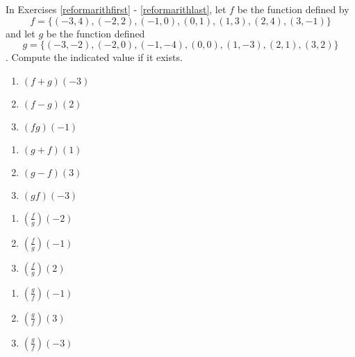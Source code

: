 In Exercises \ref{reformarithfirst} - \ref{reformarithlast}, let $f$ be the function defined by \[f = \{(-3, 4), (-2, 2), (-1, 0), (0, 1), (1, 3), (2, 4), (3, -1)\}\] and let $g$ be the function defined \[g = \{(-3, -2), (-2, 0), (-1, -4), (0, 0), (1, -3), (2, 1), (3, 2)\}\]. Compute the indicated value if it exists.

\begin{multicols}{3}
\begin{enumerate}
\setcounter{enumi}{\value{HW}}

\item $(f + g)(-3)$ \label{reformarithfirst}
\item $(f - g)(2)$
\item $(fg)(-1)$

\setcounter{HW}{\value{enumi}}
\end{enumerate}
\end{multicols}

\begin{multicols}{3}
\begin{enumerate}
\setcounter{enumi}{\value{HW}}

\item $(g + f)(1)$
\item $(g - f)(3)$
\item $(gf)(-3)$

\setcounter{HW}{\value{enumi}}
\end{enumerate}
\end{multicols}

\begin{multicols}{3}
\begin{enumerate}
\setcounter{enumi}{\value{HW}}

\item $\left(\frac{f}{g}\right)(-2)$
\item $\left(\frac{f}{g}\right)(-1)$
\item $\left(\frac{f}{g}\right)(2)$

\setcounter{HW}{\value{enumi}}
\end{enumerate}
\end{multicols}

\begin{multicols}{3}
\begin{enumerate}
\setcounter{enumi}{\value{HW}}

\item $\left(\frac{g}{f}\right)(-1)$
\item $\left(\frac{g}{f}\right)(3)$
\item $\left(\frac{g}{f}\right)(-3)$ \label{reformarithlast}

\setcounter{HW}{\value{enumi}}
\end{enumerate}
\end{multicols}

